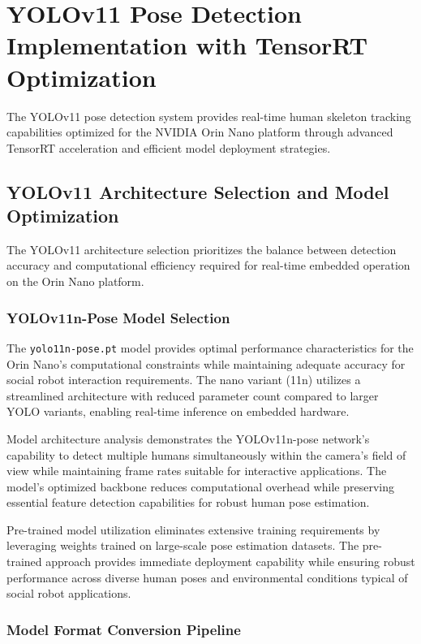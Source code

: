 \section{YOLOv11 Pose Detection Implementation with TensorRT Optimization}

The YOLOv11 pose detection system provides real-time human skeleton tracking capabilities optimized for the NVIDIA Orin Nano platform through advanced TensorRT acceleration and efficient model deployment strategies.

\subsection{YOLOv11 Architecture Selection and Model Optimization}

The YOLOv11 architecture selection prioritizes the balance between detection accuracy and computational efficiency required for real-time embedded operation on the Orin Nano platform.

\subsubsection{YOLOv11n-Pose Model Selection}

The \texttt{yolo11n-pose.pt} model provides optimal performance characteristics for the Orin Nano's computational constraints while maintaining adequate accuracy for social robot interaction requirements. The nano variant (11n) utilizes a streamlined architecture with reduced parameter count compared to larger YOLO variants, enabling real-time inference on embedded hardware.

Model architecture analysis demonstrates the YOLOv11n-pose network's capability to detect multiple humans simultaneously within the camera's field of view while maintaining frame rates suitable for interactive applications. The model's optimized backbone reduces computational overhead while preserving essential feature detection capabilities for robust human pose estimation.

Pre-trained model utilization eliminates extensive training requirements by leveraging weights trained on large-scale pose estimation datasets. The pre-trained approach provides immediate deployment capability while ensuring robust performance across diverse human poses and environmental conditions typical of social robot applications.

\subsubsection{Model Format Conversion Pipeline}

